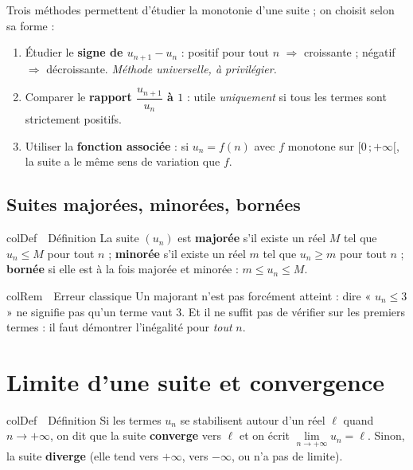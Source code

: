 \documentclass[11pt,a4paper]{article}
\newenvironment{definition}[1][Définition]
  {\begin{fiche}{colDef}{\ding{110}~~#1}}{\end{fiche}}
\newenvironment{remarque}[1][Remarque]
  {\begin{fiche}{colRem}{\ding{43}~~#1}}{\end{fiche}}
\begin{document}
Trois méthodes permettent d'étudier la monotonie d'une suite ; on choisit selon sa forme :

\begin{enumerate}[leftmargin=8mm, itemsep=1mm]
  \item Étudier le \textbf{signe de $u_{n+1} - u_n$} : positif pour tout $n$ $\Rightarrow$ croissante ; négatif $\Rightarrow$ décroissante. \emph{Méthode universelle, à privilégier.}
  \item Comparer le \textbf{rapport $\dfrac{u_{n+1}}{u_n}$ à $1$} : utile \emph{uniquement} si tous les termes sont strictement positifs.
  \item Utiliser la \textbf{fonction associée} : si $u_n = f(n)$ avec $f$ monotone sur $[0\,;+\infty[$, la suite a le même sens de variation que $f$.
\end{enumerate}

\subsection{Suites majorées, minorées, bornées}

\begin{definition}
La suite $(u_n)$ est \textbf{majorée} s'il existe un réel $M$ tel que $u_n \leq M$ pour tout $n$ ; \textbf{minorée} s'il existe un réel $m$ tel que $u_n \geq m$ pour tout $n$ ; \textbf{bornée} si elle est à la fois majorée et minorée : $m \leq u_n \leq M$.
\end{definition}

\begin{remarque}[Erreur classique]
Un majorant n'est pas forcément atteint : dire « $u_n \leq 3$ » ne signifie pas qu'un terme vaut $3$. Et il ne suffit pas de vérifier sur les premiers termes : il faut démontrer l'inégalité pour \emph{tout} $n$.
\end{remarque}

\section{Limite d'une suite et convergence}

\begin{definition}
Si les termes $u_n$ se stabilisent autour d'un réel $\ell$ quand $n \to +\infty$, on dit que la suite \textbf{converge} vers $\ell$ et on écrit $\lim\limits_{n \to +\infty} u_n = \ell$. Sinon, la suite \textbf{diverge} (elle tend vers $+\infty$, vers $-\infty$, ou n'a pas de limite).
\end{definition}
\end{document}
